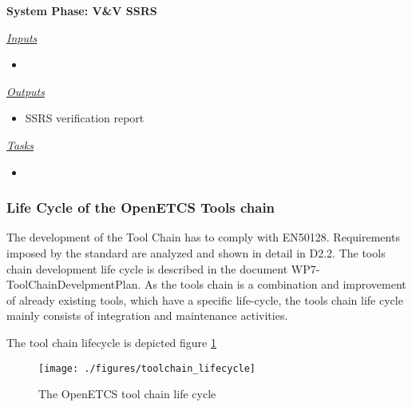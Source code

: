 \documentclass{template/openetcs_article}
\begin{document}
\begin{description}
\item \textbf{System Phase: V\&V SSRS}

\underline{\textit{Inputs}}
\begin{itemize}
\item 
\end{itemize}

\underline{\textit{Outputs}}
\begin{itemize}
\item SSRS verification report
\end{itemize}

\underline{\textit{Tasks}}
\begin{itemize}
\item 
\end{itemize}
\end{description}

\subsubsection{Life Cycle of the OpenETCS Tools chain}
The development of the Tool Chain has to comply with EN50128. Requirements imposed by the standard are analyzed and shown in detail in D2.2. The tools chain development life cycle is described in the document WP7-ToolChainDevelpmentPlan. As the tools chain is a combination and improvement of already existing tools, which have a specific life-cycle, the tools chain life cycle mainly consists of integration and maintenance activities. 

The tool chain lifecycle is depicted figure  \ref{fig:TC_lifecycle}

\begin{figure}[H]
\centering
  \texttt{[image: ./figures/toolchain\_lifecycle]}
  \caption{The OpenETCS tool chain life cycle}
  \label{fig:TC_lifecycle}
\end{figure}

\end{document}
